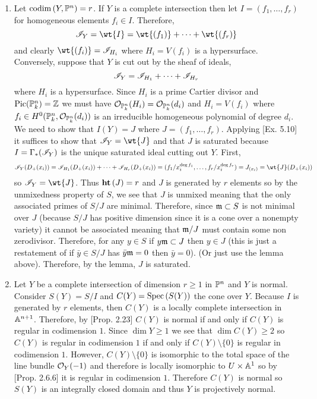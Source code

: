 \documentclass[12pt]{article}
\begin{document}
\begin{enumerate}
\item Let $\codim{Y, \P^n} = r$. If $Y$ is a complete intersection then let $I = (f_1, \dots, f_r)$ for homogeneous elements $f_i \in I$. Therefore, 
\[ \I_Y = \wt{I} = \wt{(f_1)} + \cdots + \wt{(f_r)} \]
and clearly $\wt{(f_i)} = \I_{H_i}$ where $H_i = V(f_i)$ is a hypersurface.
\bigskip\\
Conversely, suppose that $Y$ is cut out by the sheaf of ideals,
\[ \I_Y = \I_{H_1} + \cdots + \I_{H_r} \]
where $H_i$ is a hypersurface. Since $H_i$ is a prime Cartier divisor and $\Pic{\P^n_k} = \Z$ we must have $\struct{\P^n_k}(H_i) = \struct{\P^n_k}(d_i)$ and $H_i = V(f_i)$ where $f_i \in H^0(\P^n_k, \struct{\P^n_k}(d_i))$ is an irreducible homogeneous polynomial of degree $d_i$. We need to show that $I(Y) = J$ where $J = (f_1, \dots, f_r)$. Applying [Ex. 5.10] it suffices to show that $\I_Y = \wt{J}$ and that $J$ is saturated because $I = \Gamma_*(\I_Y)$ is the unique saturated ideal cutting out $Y$. First, 
\[ \I_Y(D_+(x_i)) = \I_{H_1}(D_+(x_i)) + \cdots + \I_{H_r}(D_+(x_i)) = (f_1/x_i^{\deg{f_1}}, \dots, f_r/x_i^{\deg{f_r}}) = J_{(x_i)} = \wt{J}(D_+(x_i)) \]
so $\I_Y = \wt{J}$. Thus $\height{J} = r$ and $J$ is generated by $r$ elements so by the unmixedness property of $S$, we see that $J$ is unmixed meaning that the only associated primes of $S/J$ are minimal. Therefore, since $\m \subset S$ is not minimal over $J$ (because $S/J$ has positive dimension since it is a cone over a nonempty variety) it cannot be associated meaning that $\m/J$ must contain some non zerodivisor. Therefore, for any $y \in S$ if $y \m \subset J$ then $y \in J$ (this is just a restatement of if $\bar{y} \in S/J$ has $\bar{y} \m = 0$ then $\bar{y} = 0$). (Or just use the lemma above). Therefore, by the lemma, $J$ is saturated.

\item Let $Y$ be a complete intersection of dimension $r \ge 1$ in $\P^n$ and $Y$ is normal. Consider $S(Y) = S/I$ and $C(Y) = \Spec{S(Y)}$ the cone over $Y$. Because $I$ is generated by $r$ elements, then $C(Y)$ is a locally complete intersection in $\A^{n+1}$. Therefore, by [Prop. 2.23] $C(Y)$ is normal if and only if $C(Y)$ is regular in codimension $1$. Since $\dim{Y} \ge 1$ we see that $\dim{C(Y)} \ge 2$ so $C(Y)$ is regular in codimension $1$ if and only if $C(Y) \setminus \{ 0 \}$ is regular in codimension $1$. However, $C(Y) \setminus \{ 0 \}$ is isomorphic to the total space of the line bundle $\struct{Y}(-1)$ and therefore is locally isomorphic to $U \times \A^1$ so by [Prop. 2.6.6] it is regular in codimension $1$. Therefore $C(Y)$ is normal so $S(Y)$ is an integrally closed domain and thus $Y$ is projectively normal.


\end{enumerate}
\end{document}

